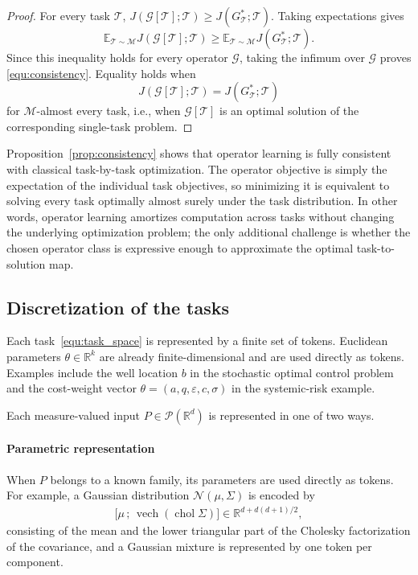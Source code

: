 \documentclass[preprint]{elsarticle}
\newcommand{\R}{\mathbb{R}}
\newcommand{\E}{\mathbb{E}}
\newcommand{\pr}{\mathscr{P}}
\newcommand{\sM}{\mathcal{M}}
\newcommand{\sT}{\mathcal{T}}
\newcommand{\sG}{\mathcal{G}}
\begin{document}
\begin{proof}
For every task $\sT$, $J(\sG[\sT];\sT) \ge J(G_\sT^*;\sT)$. Taking expectations gives
\[
\E_{\sT\sim\sM}J(\sG[\sT];\sT)
\ge
\E_{\sT\sim\sM}J(G_\sT^*;\sT).
\]
Since this inequality holds for every operator $\sG$, taking the infimum over $\sG$ proves
\eqref{equ:consistency}. Equality holds when
\[
J(\sG[\sT];\sT)=J(G_\sT^*;\sT)
\]
for $\sM$-almost every task, i.e., when $\sG[\sT]$ is an optimal solution of the corresponding single-task problem.
\end{proof}

Proposition~\ref{prop:consistency} shows that operator learning is fully consistent with classical task-by-task optimization. The operator objective is simply the expectation of the individual task objectives, so minimizing it is equivalent to solving every task optimally almost surely under the task distribution. In other words, operator learning amortizes computation across tasks without changing the underlying optimization problem; the only additional challenge is whether the chosen operator class is expressive enough to approximate the optimal task-to-solution map.

\subsection{Discretization of the tasks}\label{sec:task_disc}

Each task~\eqref{equ:task_space} is represented by a finite set of tokens. Euclidean parameters $\theta\in\R^k$ are already finite-dimensional and are used directly as tokens. Examples include the well location $b$ in the stochastic optimal control problem and the cost-weight vector $\theta=(a,q,\varepsilon,c,\sigma)$ in the systemic-risk example.

Each measure-valued input $P\in\pr(\R^d)$ is represented in one of two ways.

\paragraph{Parametric representation}
When $P$ belongs to a known family, its parameters are used directly as tokens. For example, a Gaussian distribution $\mathcal N(\mu,\Sigma)$ is encoded by
\begin{align}
    \bigl[\mu\,;\,\operatorname{vech}(\operatorname{chol}\Sigma)\bigr]
    \in
    \R^{d+d(d+1)/2},
    \label{equ:gauss_token}
\end{align}
consisting of the mean and the lower triangular part of the Cholesky factorization of the covariance, and a Gaussian mixture is represented by one token per component.
\end{document}
